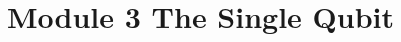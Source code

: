 \section{Module 3 The Single Qubit}


\begin{comment}

\subsection{Module 4: Quantum linear algebra, part II}


\subsection{Module 5: Multiple qubits, part I}


\subsection{Module 6: Multiple qubits, part II}


\subsection{Module 7: Interlude: Principles of quantum mechanics}


\subsection{Module 8: The EPR paradox, no-cloning}


\subsection{Module 9: Gates and circuits}


\subsection{Module 10: Algorithms, part I}


\subsection{Module 11: Algorithms, part II}


\subsection{Module 12: Adiabatic quantum computing}



\end{comment}
